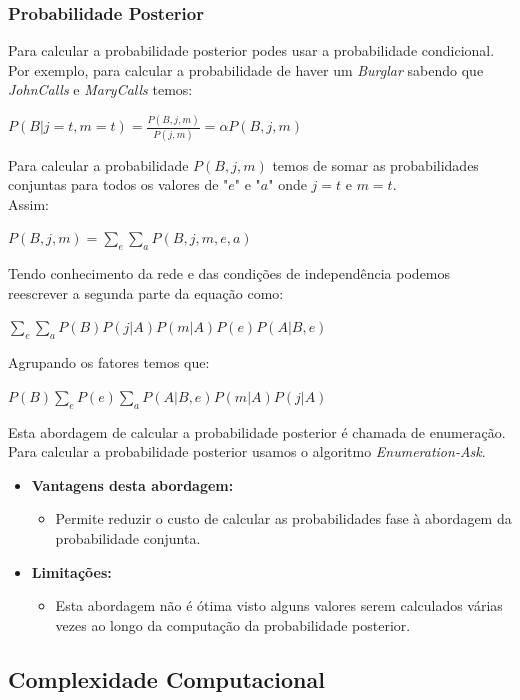 \documentclass[9pt, a4paper, twocolumn]{article}
\begin{document}
\subsubsection{Probabilidade Posterior}
\hspace{10mm}Para calcular a probabilidade posterior podes usar a probabilidade condicional. Por exemplo, para calcular a probabilidade de haver um \textit{Burglar} sabendo que \textit{JohnCalls} e \textit{MaryCalls} temos:
\begin{center}
$P(B|j=t, m=t)=\displaystyle\frac{P(B,j,m)}{P(j,m)}=\alpha P(B,j,m)$
\end{center}
Para calcular a probabilidade $P(B, j, m)$ temos de somar as probabilidades conjuntas para todos os valores de "$e$" e "$a$" onde $j=t$ e $m=t$.\\
Assim:
\begin{center}
$P(B, j, m) = \displaystyle\sum_{e}\sum_{a}P(B, j, m, e, a)$
\end{center}
Tendo conhecimento da rede e das condições de independência podemos reescrever a segunda parte da equação como:
\begin{center}
$\displaystyle\sum_{e}\sum_{a}P(B)P(j|A)P(m|A)P(e)P(A|B,e)$
\end{center}
Agrupando os fatores temos que:
\begin{center}
$P(B)\displaystyle\sum_{e}P(e)\displaystyle\sum_{a}P(A|B, e)P(m|A)P(j|A)$
\end{center}
Esta abordagem de calcular a probabilidade posterior é chamada de enumeração. Para calcular a probabilidade posterior usamos o algoritmo \emph{Enumeration-Ask}.
\begin{itemize}
\item \textbf{Vantagens desta abordagem:}
\begin{itemize}
\item Permite reduzir o custo de calcular as probabilidades fase à abordagem da probabilidade conjunta.
\end{itemize}
\item \textbf{Limitações:}
\begin{itemize}
\item Esta abordagem não é ótima visto alguns valores serem calculados várias vezes ao longo da computação da probabilidade posterior.
\end{itemize}
\end{itemize}
\subsection{Complexidade Computacional}
\end{document}
